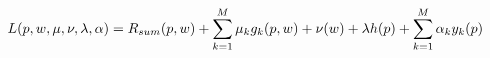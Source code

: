 \documentclass[preview]{standalone}
\begin{document}
\begin{align*}
\raggedleft L(p, w, \mu, \nu, \lambda, \alpha) = R_{sum}(p,w) + \sum_{k=1}^{M}\mu_k g_k(p,w) + \nu(w) + \lambda h(p) + \sum_{k=1}^{M} {\alpha_k y_k(p)}
\end{align*}
\end{document}
